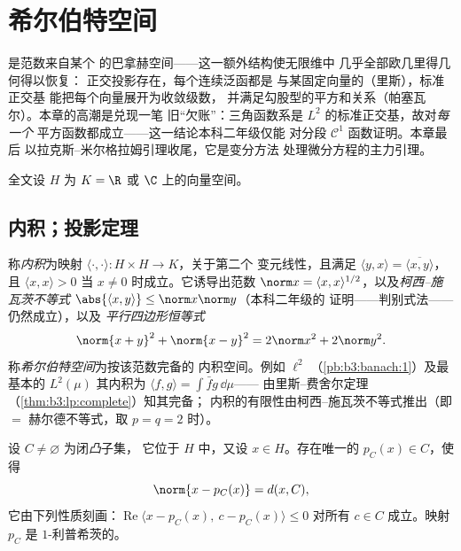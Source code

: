 \chapter{希尔伯特空间}\label{ch:b3:hilbert}

是范数来自某个
的巴拿赫空间——这一额外结构使无限维中
几乎全部欧几里得几何得以恢复：
正交投影存在，每个连续泛函都是
与某固定向量的（里斯），标准正交基
能把每个向量展开为收敛级数，
并满足勾股型的平方和关系（帕塞瓦尔）。本章的高潮是兑现一笔
旧“欠账”：三角函数系是
$L^2$ 的标准正交基，故对\emph{每一个}
平方函数都成立——这一结论本科二年级仅能
对分段 $\mathcal C^1$ 函数证明。本章最后
以拉克斯–米尔格拉姆引理收尾，它是变分方法
处理微分方程的主力引理。

全文设 $H$ 为 $K = \R$ 或 $\C$ 上的向量空间。

\section{内积；投影定理}

\begin{definition}\label{def:b3:hilbert:inner}
称\emph{内积}为映射 $\langle
\cdot,\cdot\rangle \colon H\times H \to K$，关于第二个
变元线性，且满足 $\langle y, x\rangle =
\overline{\langle x, y\rangle}$，且 $\langle x, x\rangle > 0$
当 $x \neq 0$ 时成立。它诱导出范数 $\norm x = \langle x,
x\rangle^{1/2}$，以及\emph{柯西–施瓦茨不等式}
$\abs{\langle x, y\rangle} \leq \norm x\norm y$（本科二年级的
证明——判别式法——仍然成立），以及
\emph{平行四边形恒等式}
\[
\norm{x + y}^2 + \norm{x - y}^2 = 2\norm x^2 + 2\norm y^2 .
\]
称\emph{希尔伯特空间}为按该范数完备的
内积空间。例如 $\ell^2$
（\cref{pb:b3:banach:1}）及最基本的 $L^2(\mu)$
其内积为 $\langle f, g\rangle = \int\bar fg\,\dd\mu$——
由里斯–费舍尔定理（\cref{thm:b3:lp:complete}）知其完备；
内积的有限性由柯西–施瓦茨不等式推出（即 $=$ 赫尔德不等式，取
$p = q = 2$ 时）。
\end{definition}

\begin{theorem}[向闭凸集的投影]
\label{thm:b3:hilbert:projection}
设 $C \neq \varnothing$ 为闭\emph{凸}子集，
它位于 $H$ 中，又设 $x \in H$。存在唯一的 $p_C(x)
\in C$，使得
\[
\norm{x - p_C(x)} = d(x, C),
\]
它由下列性质刻画：$\operatorname{Re}\langle x - p_C(x),\ c -
p_C(x)\rangle \leq 0$ 对所有 $c \in C$ 成立。映射 $p_C$ 是
$1$-利普希茨的。
\end{theorem}

